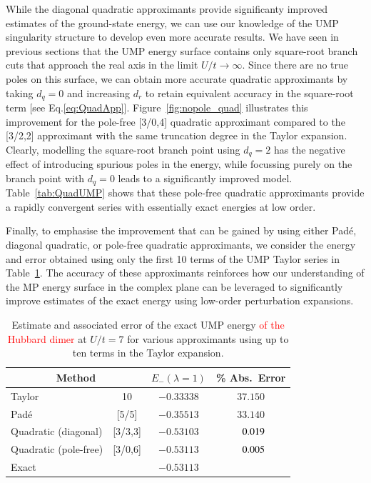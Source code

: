 \documentclass[aps,prb,reprint,noshowkeys,superscriptaddress]{revtex4-1}
\newcommand{\titou}[1]{\textcolor{red}{#1}}
\newcommand{\mc}{\multicolumn}
\begin{document}
While the diagonal quadratic approximants provide significanty improved estimates of the 
ground-state energy, we can use our knowledge of the UMP singularity structure to develop
even more accurate results.
We have seen in previous sections that the UMP energy surface
contains only square-root branch cuts that approach the real axis in the limit $U/t \to \infty$. 
Since there are no true poles on this surface, we can obtain more accurate quadratic approximants by
taking $d_q = 0$ and increasing $d_r$ to retain equivalent accuracy in the square-root term [see Eq.\eqref{eq:QuadApp}].
Figure~\ref{fig:nopole_quad} illustrates this improvement for the pole-free [3/0,4] quadratic
approximant compared to the [3/2,2] approximant with the same truncation degree in the Taylor
expansion.
Clearly, modelling the square-root branch point using $d_q = 2$ has the negative effect of
introducing spurious poles in the energy, while focussing purely on the branch point with $d_q = 0$
leads to a significantly improved model.
Table~\ref{tab:QuadUMP} shows that these pole-free quadratic approximants
provide a rapidly convergent series with essentially exact energies at low order.


Finally, to emphasise the improvement that can be gained by using either Pad\'e, diagonal quadratic,
or pole-free quadratic approximants, we consider the energy and error obtained using only the first 10 terms of the UMP
Taylor series in Table~\ref{tab:UMP_order10}.
The accuracy of these approximants reinforces how our understanding of the MP
energy surface in the complex plane can be leveraged to significantly improve estimates of the exact
energy using low-order perturbation expansions.

\begin{table}[h]
	\caption{
    Estimate and associated error of the exact UMP energy \titou{of the Hubbard dimer} at $U/t = 7$ for 
    various approximants using up to ten terms in the Taylor expansion.
	\label{tab:UMP_order10}}
	\begin{ruledtabular}
		\begin{tabular}{lccc}
            \mc{2}{c}{Method}	 &	$E_{-}(\lambda = 1)$ & \% Abs.\ Error \\ 
			\hline
            Taylor		         &	 10	         &	$-0.33338$      &  $37.150$ \\
            Pad\'e               &   [5/5]       &  $-0.35513$      &  $33.140$ \\
            Quadratic (diagonal) &   [3/3,3]     &  $-0.53103$      &  $\hphantom{0}0.019$ \\
            Quadratic (pole-free)&   [3/0,6]     &  $-0.53113$      &  $\hphantom{0}0.005$ \\
			\hline
            Exact		         &	        	 &	$-0.53113$	     &            \\
		\end{tabular}
	\end{ruledtabular}
\end{table}
\end{document}
